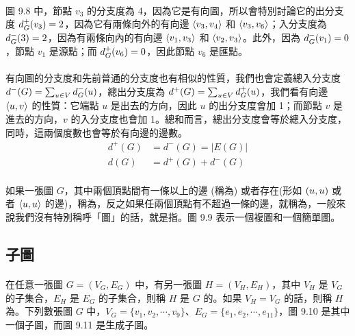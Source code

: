 \documentclass[12pt,a4paper,oneside]{report}
\begin{document}
\begin{CJK}{UTF8}{bkai}
\paragraph{}圖 9.8 中，節點 $v_3$ 的分支度為 4，因為它是有向圖，所以會特別討論它的出分支度 $d^{+}_{G}{(v_3)}=2$，因為它有兩條向外的有向邊 $\langle{}{{v_3},{v_4}}\rangle{}$ 和 $\langle{}{{v_3},{v_6}}\rangle{}$；入分支度為 $d^{-}_{G}{(3)}=2$，因為有兩條向內的有向邊 $\langle{}{{v_1},{v_3}}\rangle{}$ 和 $\langle{}{{v_2},{v_3}}\rangle{}$。此外，因為 $d^{-}_{G}{(v_1)}=0$，節點 $v_1$ 是源點；而 $d^{+}_{G}{(v_6)}=0$，因此節點 $v_6$ 是匯點。
\paragraph{}有向圖的分支度和先前普通的分支度也有相似的性質，我們也會定義總入分支度 $d^{-}{(G)}=\sum_{u\in{V}}{d^{-}_{G}{(u)}}$，總出分支度為 $d^{+}{(G)}=\sum_{u\in{V}}{d^{+}_{G}{(u)}}$，我們看有向邊 $\langle{}{{u},{v}}\rangle{}$ 的性質：它端點 $u$ 是出去的方向，因此 $u$ 的出分支度會加 1；而節點 $v$ 是進去的方向，$v$ 的入分支度也會加 1。總和而言，總出分支度會等於總入分支度，同時，這兩個度數也會等於有向邊的邊數。
\begin{align}
\label{eq-degree-directed}
d^{+}{(G)}&=d^{-}{(G)}=|E(G)|\\
d(G)&=d^{+}{(G)}+d^{-}{(G)}
\end{align}
\paragraph{}如果一張圖 $G$，其中兩個頂點間有一條以上的邊 (稱為) 或者存在\textbf{}(形如 $({u},{u})$ 或者 $\langle{}{{u},{u}}\rangle{}$ 的邊)，稱為，反之如果任兩個頂點有不超過一條的邊，就稱為\textbf{}，一般來說我們沒有特別稱呼「圖」的話，就是指。圖 9.9 表示一個複圖和一個簡單圖。

\subsection{子圖}
\paragraph{}在任意一張圖 $G=(V_G, E_G)$ 中，有另一張圖 $H=(V_H, E_H)$，其中 $V_H$ 是 $V_G$ 的子集合，$E_H$ 是 $E_G$ 的子集合，則稱 $H$ 是 $G$ 的\textbf{}。如果 $V_H=V_G$ 的話，則稱 $H$ 為\textbf{}。下列數張圖 $G$ 中，$V_G=\{v_1,v_2,\cdots{},v_9\}$、$E_G=\{e_1,e_2,\cdots{},e_{11}\}$，圖 9.10 是其中一個子圖，而圖 9.11 是生成子圖。

\end{CJK}
\end{document}
